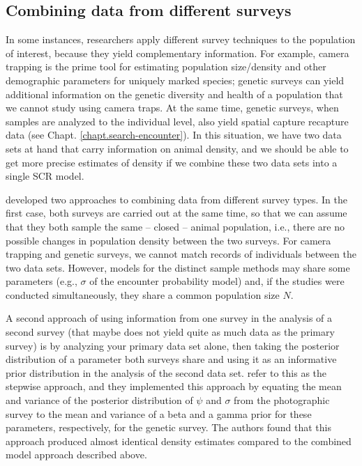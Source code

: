 \subsection{Combining data from different surveys}

In some instances, researchers apply different survey techniques to
the population of interest, because they yield complementary
information. For example, camera trapping is the prime tool for
estimating population size/density and other demographic parameters
for uniquely marked species; genetic surveys can yield additional
information on the genetic diversity and health of a population that
we cannot study using camera traps. At the same time, genetic surveys,
when samples are analyzed to the individual level, also yield spatial
capture recapture data (see Chapt. \ref{chapt.search-encounter}). In
this situation, we have two data sets at hand that carry information
on animal density, and we should be able to get more precise estimates
of density if we combine these two data sets into a single SCR model.

\citet{gopalaswamy_etal:2012mee} developed two approaches to combining
data from different survey types. In the first case, both surveys are
carried out at the same time, so that we can assume that they both
sample the same -- closed -- animal population, i.e., there are no
possible changes in population density between the two surveys. For
camera trapping and genetic surveys, we cannot match records of
individuals between the two data sets. However, models for the
distinct sample methods may share some parameters (e.g., $\sigma$ of
the encounter probability model) and, if the studies were conducted
simultaneously, they share a common population size $N$.

A second approach of using information from one survey in the analysis
of a second survey (that maybe does not yield quite as much data as
the primary survey) is by analyzing your primary data set alone, then
taking the posterior distribution of a parameter both surveys share
and using it as an informative prior distribution in the analysis of
the second data set. \citet{gopalaswamy_etal:2012mee} refer to this as
the stepwise approach, and they implemented this approach by equating
the mean and variance of the posterior distribution of $\psi$ and
$\sigma$ from the photographic survey to the mean and variance of a
beta and a gamma prior for these parameters, respectively, for the
genetic survey. The authors found that this approach produced almost
identical density estimates compared to the combined model approach
described above.

